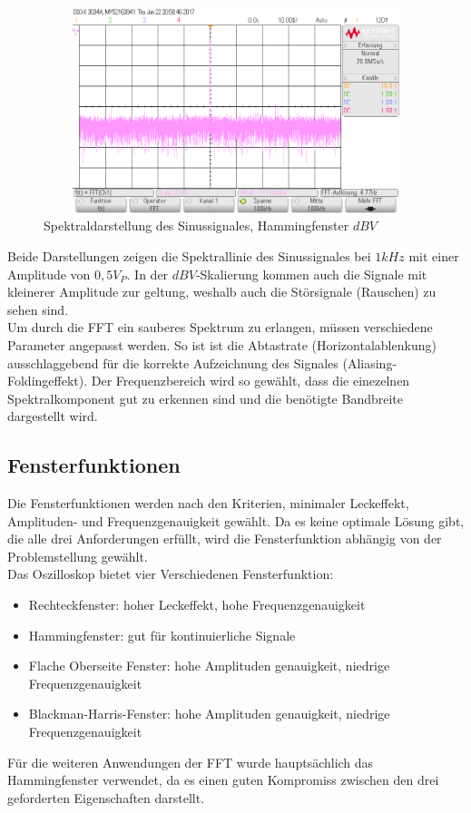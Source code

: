 \begin{figure}[H]
 \begin{center}
  \includegraphics[height=6cm,width=12cm]{OsziBilder/bsp1_Hanning_dB}
 \end{center}
 \caption{Spektraldarstellung des Sinussignales, Hammingfenster $dBV$}
\end{figure}
\noindent
Beide Darstellungen zeigen die Spektrallinie des Sinussignales bei $1kHz$ mit einer Amplitude von $0,5V_P$. In der $dBV$-Skalierung kommen auch die Signale mit kleinerer Amplitude zur geltung, weshalb auch die Störsignale (Rauschen) zu sehen sind.\\
Um durch die FFT ein sauberes Spektrum zu erlangen, müssen verschiedene Parameter angepasst werden. So ist ist die Abtastrate (Horizontalablenkung) ausschlaggebend für die korrekte Aufzeichnung des Signales (Aliasing- Foldingeffekt). Der Frequenzbereich wird so gewählt, dass
die einezelnen Spektralkomponent gut zu erkennen sind und die benötigte Bandbreite dargestellt wird.\\

\newpage
\subsection{Fensterfunktionen}

Die Fensterfunktionen werden nach den Kriterien, minimaler Leckeffekt, Amplituden- und Frequenzgenauigkeit gewählt. Da es keine optimale Lösung gibt, die alle drei Anforderungen erfüllt, wird
die Fensterfunktion abhängig von der Problemstellung gewählt.\\
Das Oszilloskop bietet vier Verschiedenen Fensterfunktion:\\
\begin{itemize}
 \item Rechteckfenster: hoher Leckeffekt, hohe Frequenzgenauigkeit\\
 \item Hammingfenster: gut für kontinuierliche Signale\\
 \item Flache Oberseite Fenster: hohe Amplituden genauigkeit, niedrige Frequenzgenauigkeit \\
 \item Blackman-Harris-Fenster:  hohe Amplituden genauigkeit, niedrige Frequenzgenauigkeit\\
\end{itemize}
Für die weiteren Anwendungen der FFT wurde hauptsächlich das Hammingfenster verwendet, da es einen guten Kompromiss
zwischen den drei geforderten Eigenschaften darstellt.\\
